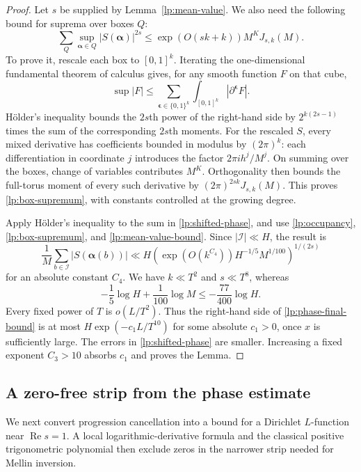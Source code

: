 \begin{proof}
Let $s$ be supplied by Lemma~\ref{lp:mean-value}.  We also need the
following bound for suprema over boxes $Q$:
\begin{equation}\label{lp:box-supremum}
 \sum_Q\sup_{\boldsymbol\alpha\in Q}|S(\boldsymbol\alpha)|^{2s}
 \le\exp(O(sk+k))M^KJ_{s,k}(M).
\end{equation}
To prove it, rescale each box to $[0,1]^k$.  Iterating the
one-dimensional fundamental theorem of calculus gives, for any smooth
function $F$ on that cube,
\[
 \sup|F|\le\sum_{\boldsymbol\epsilon\in\{0,1\}^k}
       \int_{[0,1]^k}|\partial^{\boldsymbol\epsilon}F|.
\]
H\"older's inequality bounds the $2s$th power of the right-hand side
by $2^{k(2s-1)}$ times the sum of the corresponding $2s$th moments.
For the rescaled $S$, every mixed derivative has coefficients bounded
in modulus by $(2\pi)^k$: each differentiation in coordinate $j$
introduces the factor $2\pi i h^j/M^j$.
On summing over the boxes, change of variables contributes $M^K$.
Orthogonality then bounds the full-torus moment of every such derivative
by $(2\pi)^{2sk}J_{s,k}(M)$.  This proves
\eqref{lp:box-supremum}, with constants controlled at the growing degree.

Apply H\"older's inequality to the sum in
\eqref{lp:shifted-phase}, and use \eqref{lp:occupancy},
\eqref{lp:box-supremum}, and \eqref{lp:mean-value-bound}.  Since
$|\mathcal I|\ll H$, the result is
\begin{equation}\label{lp:phase-final-bound}
 \frac1M\sum_{b\in\mathcal I}|S(\boldsymbol\alpha(b))|
 \ll H\left(\exp(O(k^{C_4}))H^{-1/5}M^{1/100}\right)^{1/(2s)}
\end{equation}
for an absolute constant $C_4$.
We have $k\ll T^2$ and $s\ll T^8$, whereas
\[
 -\frac15\log H+\frac1{100}\log M
       \le-\frac{77}{400}\log H.
\]
Every fixed power of $T$ is $o(L/T^2)$.  Thus the right-hand side
of \eqref{lp:phase-final-bound} is at most
$H\exp(-c_1L/T^{10})$ for some absolute $c_1>0$, once $x$ is
sufficiently large.  The errors in \eqref{lp:shifted-phase} are smaller.
Increasing a fixed exponent $C_3>10$ absorbs $c_1$ and proves the Lemma.
\end{proof}

\subsection{A zero-free strip from the phase estimate}

We next convert progression cancellation into a bound for a Dirichlet
$L$-function near $\operatorname{Re}s=1$. A local logarithmic-derivative
formula and the classical positive trigonometric polynomial then exclude
zeros in the narrower strip needed for Mellin inversion.


